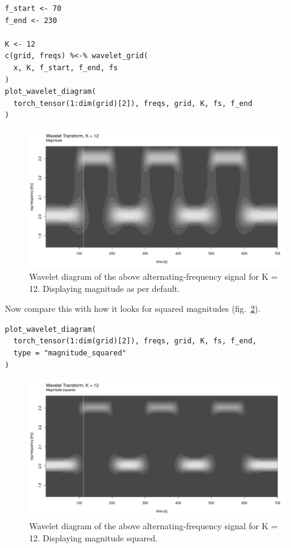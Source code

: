 \documentclass[
  letterpaper,
]{krantz}
\begin{document}
\begin{verbatim}
f_start <- 70
f_end <- 230

K <- 12
c(grid, freqs) %<-% wavelet_grid(
  x, K, f_start, f_end, fs
)
plot_wavelet_diagram(
  torch_tensor(1:dim(grid)[2]), freqs, grid, K, fs, f_end
)
\end{verbatim}

\begin{figure}[H]

{\centering \includegraphics{images/wav-example-long-diag1.png}

}

\caption{\label{fig-wav-example-long-diag1}Wavelet diagram of the above
alternating-frequency signal for K = 12. Displaying magnitude as per
default.}

\end{figure}

Now compare this with how it looks for squared magnitudes
(fig.~\ref{fig-wav-example-long-diag2}).

\begin{verbatim}
plot_wavelet_diagram(
  torch_tensor(1:dim(grid)[2]), freqs, grid, K, fs, f_end,
  type = "magnitude_squared"
)
\end{verbatim}

\begin{figure}[H]

{\centering \includegraphics{images/wav-example-long-diag2.png}

}

\caption{\label{fig-wav-example-long-diag2}Wavelet diagram of the above
alternating-frequency signal for K = 12. Displaying magnitude squared.}

\end{figure}
\end{document}
